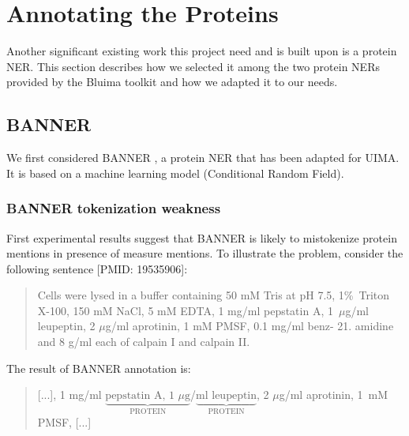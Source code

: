 \documentclass{report}
\begin{document}
                \section{Annotating the Proteins}
                \label{sec:annot_prot}
                
                Another significant existing work this project need and is built 
                upon is a protein NER. This section describes how we selected it
                among the two protein NERs provided by the Bluima toolkit \cite{bluima} and how we adapted it to our needs.
                
                \subsection{BANNER}
                We first considered BANNER \cite{banner}, a protein NER that has
                been adapted for UIMA. It is based on a machine learning model 
                (Conditional Random Field).
                        \subsubsection{BANNER tokenization weakness} 
                        First experimental results suggest that BANNER is likely to mistokenize
                        protein mentions in presence of measure mentions. To illustrate the problem, consider the
                        following sentence [PMID: 19535906]:
                        
                        \begin{quote}
                        Cells were lysed in a buffer containing 50 mM Tris at pH 7.5, 1\%~Triton X-100, 150 mM NaCl, 
                        5 mM EDTA, 1 mg/ml pepstatin A, 1~$\mu$g/ml leupeptin, 2 $\mu$g/ml aprotinin, 1 mM PMSF, 
                        0.1 mg/ml benz- 21. amidine and 8 g/ml each of calpain I and calpain II. 
                        \end{quote}

                        The result of BANNER annotation is:
			
                        \begin{quote}
                        [...], 1 mg/ml $\underbrace{\text{pepstatin A, 1 }\mu\text{g}}_{\text{PROTEIN}}$/$\underbrace{\text{ml leupeptin}}_{\text{PROTEIN}}$, 2 $\mu$g/ml aprotinin, 1~mM PMSF, [...]
                        \end{quote}
\end{document}
